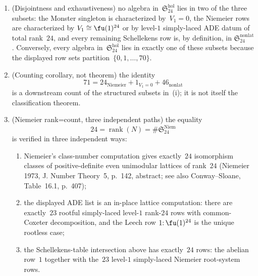 \begin{theorem}[Structured-subset derivation of the holomorphic
\texorpdfstring{$c=24$}{c=24} census; closes AP\textup{290}]
\begin{enumerate}[label=\textup{(\roman*)},leftmargin=*]
\[ \]
 row~$0$ is the Monster slot $V_1=0$, and the non-lattice summand is
 the explicit complement
 \[
 \mathfrak{S}_{24}^{\mathrm{nonlat}}
 =
 \{2\text{--}14,\;16\text{--}23,\;25\text{--}29,\;31\text{--}36,\;
 38\text{--}41,\;44\text{--}45,\;47\text{--}48,\;50,\;52\text{--}53,\;
 56\text{--}57,\;62\}.
 \]
	\item \textup{(}Disjointness and exhaustiveness\textup{)}
	 no algebra in~$\mathfrak{S}_{24}^{\mathrm{hol}}$ lies in two of the
	 three subsets: the Monster singleton is characterized by~$V_1=0$,
	 the Niemeier rows are characterized by
	 $V_1\cong \fu(1)^{24}$ or by level-$1$ simply-laced ADE datum of total
	 rank~$24$, and every remaining Schellekens row is, by definition, in
	 $\mathfrak{S}_{24}^{\mathrm{nonlat}}$. Conversely, every algebra
	 in~$\mathfrak{S}_{24}^{\mathrm{hol}}$ lies in exactly one of these
	 subsets because the displayed row sets partition~$\{0,1,\dots,70\}$.
\item \textup{(}Counting corollary, not theorem\textup{)}
 the identity
 \[
 71 = 24_{\mathrm{Niemeier}} + 1_{V_1=0} + 46_{\mathrm{nonlat}}
 \]
 is a downstream count of the structured subsets in~\textup{(i)};
 it is not itself the classification theorem.
\item \textup{(}Niemeier rank=count, three independent paths\textup{)}
 the equality
 \[
 24 = \operatorname{rank}(N)
 = \#\mathfrak{S}_{24}^{\mathrm{Niem}}
 \]
 is verified in three independent ways:
 \begin{enumerate}[label=\textup{(\alph*)},leftmargin=*]
 \item Niemeier's class-number computation gives exactly~$24$
 isomorphism classes of positive-definite even unimodular
 lattices of rank~$24$
 \textup{(}Niemeier 1973, J. Number Theory~5, p.~142, abstract; see
 also Conway--Sloane, Table~16.1, p.~407\textup{)};
 \item the displayed ADE list is an in-place lattice computation:
 there are exactly~$23$ rootful simply-laced level-$1$ rank-$24$
 rows with common-Coxeter decomposition, and the Leech row
 $1{:}\,\fu(1)^{24}$ is the unique rootless case;
 \item the Schellekens-table intersection above has exactly~$24$ rows:
 the abelian row~$1$ together with the~$23$ level-$1$ simply-laced
 Niemeier root-system rows.
 \end{enumerate}
\end{enumerate}
\end{theorem}

